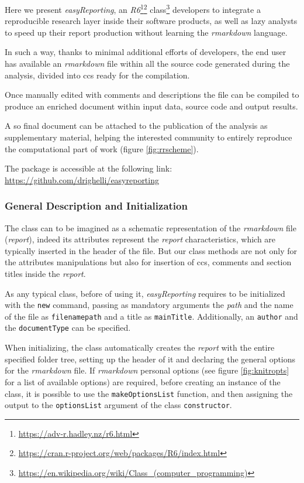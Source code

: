 Here we present \textit{easyReporting}, an \textit{R6}\footnote{\url{https://adv-r.hadley.nz/r6.html}}\footnote{\url{https://cran.r-project.org/web/packages/R6/index.html}} class\footnote{\url{https://en.wikipedia.org/wiki/Class_(computer_programming)}} developers to integrate a reproducible research layer inside their software products, as well as lazy analysts to speed up their report production without learning the \textit{rmarkdown} language.

In such a way, thanks to minimal additional efforts of developers, the end user has available an \textit{rmarkdown} file within all the source code generated during the analysis, divided into \glspl{cc} ready for the compilation.

Once manually edited with comments and descriptions the file can be compiled to produce an enriched document within input data, source code and output results.

A so final document can be attached to the publication of the analysis as supplementary material, helping the interested community to entirely reproduce the computational part of work (figure \ref{fig:rrscheme}). 

The package is accessible at the following link:\\ \href{https://github.com/drighelli/easyreporting}{https://github.com/drighelli/easyreporting} 

\subsubsection{General Description and Initialization}

The class can to be imagined as a schematic representation of the \textit{rmarkdown} file (\textit{report}), indeed 
its attributes represent the \textit{report} characteristics, which are typically inserted in the header of the file.
But our class methods are not only for the attributes manipulations but also for insertion of \glspl{cc}, comments and section titles inside the \textit{report}.

As any typical class, before of using it, \textit{easyReporting} requires to be initialized with the \lstinline!new! command, passing as mandatory arguments the \textit{path} and the name of the file as \lstinline!filenamepath! and a title as \lstinline!mainTitle!.
Additionally, an \lstinline!author! and the \lstinline!documentType! can be specified.

When initializing, the class automatically creates the \textit{report} with the entire specified folder tree, setting up the header of it and declaring the general options for the \textit{rmarkdown} file.
If \textit{rmarkdown} personal options (see figure \ref{fig:knitropts} for a list of available options) are required, before creating an instance of the class, it is possible to use the \lstinline!makeOptionsList! function, and then assigning the output to the \lstinline!optionsList! argument of the class \lstinline!constructor!.

